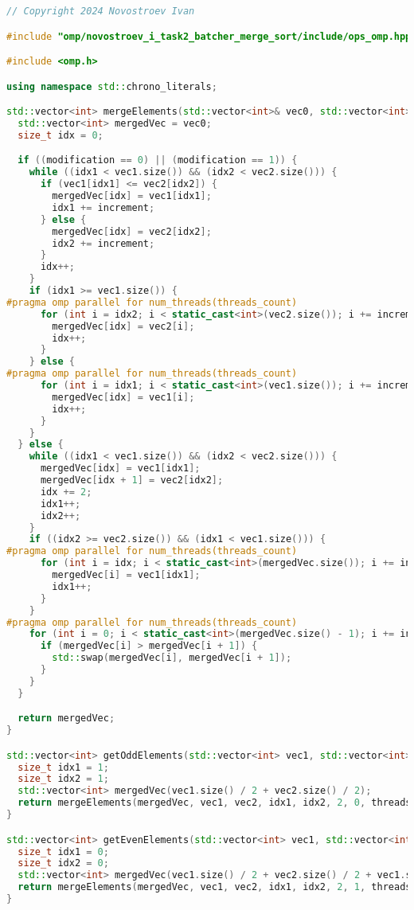 \documentclass{report}
\begin{document}
\begin{lstlisting}[language=C++,caption=OpenMP версия]
// Copyright 2024 Novostroev Ivan

#include "omp/novostroev_i_task2_batcher_merge_sort/include/ops_omp.hpp"

#include <omp.h>

using namespace std::chrono_literals;

std::vector<int> mergeElements(std::vector<int>& vec0, std::vector<int>& vec1, std::vector<int>& vec2, size_t& idx1, size_t& idx2, size_t increment, int modification, int threads_count) {
  std::vector<int> mergedVec = vec0;
  size_t idx = 0;

  if ((modification == 0) || (modification == 1)) {
    while ((idx1 < vec1.size()) && (idx2 < vec2.size())) {
      if (vec1[idx1] <= vec2[idx2]) {
        mergedVec[idx] = vec1[idx1];
        idx1 += increment;
      } else {
        mergedVec[idx] = vec2[idx2];
        idx2 += increment;
      }
      idx++;
    }
    if (idx1 >= vec1.size()) {
#pragma omp parallel for num_threads(threads_count)
      for (int i = idx2; i < static_cast<int>(vec2.size()); i += increment) {
        mergedVec[idx] = vec2[i];
        idx++;
      }
    } else {
#pragma omp parallel for num_threads(threads_count)
      for (int i = idx1; i < static_cast<int>(vec1.size()); i += increment) {
        mergedVec[idx] = vec1[i];
        idx++;
      }
    }
  } else {
    while ((idx1 < vec1.size()) && (idx2 < vec2.size())) {
      mergedVec[idx] = vec1[idx1];
      mergedVec[idx + 1] = vec2[idx2];
      idx += 2;
      idx1++;
      idx2++;
    }
    if ((idx2 >= vec2.size()) && (idx1 < vec1.size())) {
#pragma omp parallel for num_threads(threads_count)
      for (int i = idx; i < static_cast<int>(mergedVec.size()); i += increment) {
        mergedVec[i] = vec1[idx1];
        idx1++;
      }
    }
#pragma omp parallel for num_threads(threads_count)
    for (int i = 0; i < static_cast<int>(mergedVec.size() - 1); i += increment) {
      if (mergedVec[i] > mergedVec[i + 1]) {
        std::swap(mergedVec[i], mergedVec[i + 1]);
      }
    }
  }

  return mergedVec;
}

std::vector<int> getOddElements(std::vector<int> vec1, std::vector<int> vec2, int threads_count = 4) {
  size_t idx1 = 1;
  size_t idx2 = 1;
  std::vector<int> mergedVec(vec1.size() / 2 + vec2.size() / 2);
  return mergeElements(mergedVec, vec1, vec2, idx1, idx2, 2, 0, threads_count);
}

std::vector<int> getEvenElements(std::vector<int> vec1, std::vector<int> vec2, int threads_count = 4) {
  size_t idx1 = 0;
  size_t idx2 = 0;
  std::vector<int> mergedVec(vec1.size() / 2 + vec2.size() / 2 + vec1.size() % 2 + vec2.size() % 2);
  return mergeElements(mergedVec, vec1, vec2, idx1, idx2, 2, 1, threads_count);
}


\end{lstlisting}
\end{document}
